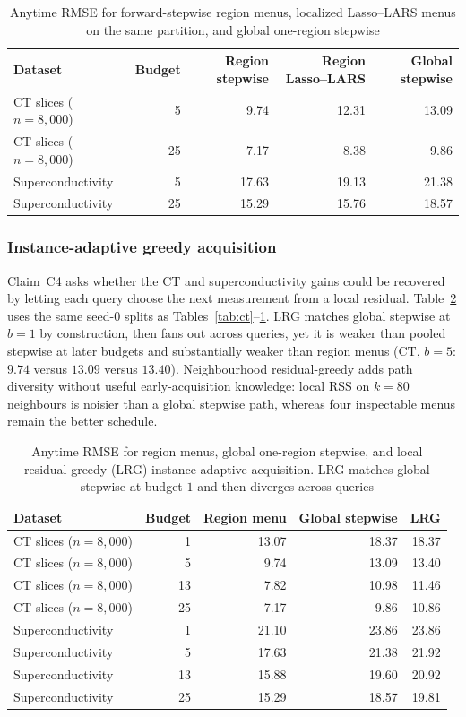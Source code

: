 \documentclass[pdflatex,sn-basic,Numbered]{sn-jnl}
\begin{document}
\begin{table}[t]
\centering
\caption{Anytime RMSE for forward-stepwise region menus, localized Lasso--LARS menus on the same partition, and global one-region stepwise}
\label{tab:lasso}
\begin{tabular}{@{}lrrrr@{}}
\toprule
Dataset & Budget & Region stepwise & Region Lasso--LARS & Global stepwise \\
\midrule
CT slices (\(n=8{,}000\)) & 5 & 9.74 & 12.31 & 13.09 \\
CT slices (\(n=8{,}000\)) & 25 & 7.17 & 8.38 & 9.86 \\
Superconductivity & 5 & 17.63 & 19.13 & 21.38 \\
Superconductivity & 25 & 15.29 & 15.76 & 18.57 \\
\bottomrule
\end{tabular}
\end{table}

\subsubsection{Instance-adaptive greedy acquisition}
\label{sec:lrg}
Claim~C4 asks whether the CT and superconductivity gains could be recovered by letting each query choose the next measurement from a local residual. Table~\ref{tab:lrg} uses the same seed-0 splits as Tables~\ref{tab:ct}--\ref{tab:lasso}. LRG matches global stepwise at \(b=1\) by construction, then fans out across queries, yet it is weaker than pooled stepwise at later budgets and substantially weaker than region menus (CT, \(b=5\): \(9.74\) versus \(13.09\) versus \(13.40\)). Neighbourhood residual-greedy adds path diversity without useful early-acquisition knowledge: local RSS on \(k=80\) neighbours is noisier than a global stepwise path, whereas four inspectable menus remain the better schedule.

\begin{table}[t]
\centering
\caption{Anytime RMSE for region menus, global one-region stepwise, and local residual-greedy (LRG) instance-adaptive acquisition. LRG matches global stepwise at budget \(1\) and then diverges across queries}
\label{tab:lrg}
\begin{tabular}{@{}lrrrr@{}}
\toprule
Dataset & Budget & Region menu & Global stepwise & LRG \\
\midrule
CT slices (\(n=8{,}000\)) & 1 & 13.07 & 18.37 & 18.37 \\
CT slices (\(n=8{,}000\)) & 5 & 9.74 & 13.09 & 13.40 \\
CT slices (\(n=8{,}000\)) & 13 & 7.82 & 10.98 & 11.46 \\
CT slices (\(n=8{,}000\)) & 25 & 7.17 & 9.86 & 10.86 \\
Superconductivity & 1 & 21.10 & 23.86 & 23.86 \\
Superconductivity & 5 & 17.63 & 21.38 & 21.92 \\
Superconductivity & 13 & 15.88 & 19.60 & 20.92 \\
Superconductivity & 25 & 15.29 & 18.57 & 19.81 \\
\bottomrule
\end{tabular}
\end{table}
\end{document}
